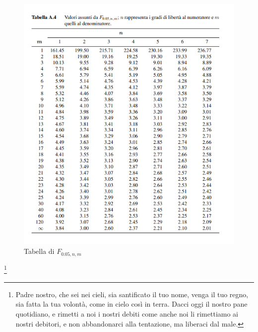 \documentclass[]{article}
\begin{document}
    \begin{figure}[H]
        \caption{Tabella di $F_{0.05, n, m}$}
        \begin{minipage}{0.59\textwidth}
            \includegraphics[width=\textwidth]{images/F_table.png}
        \end{minipage}
        \begin{minipage}{0.4\textwidth}
        \end{minipage}
    \end{figure}
    \footnote{Padre nostro, che sei nei cieli, sia santificato il tuo nome, venga il tuo regno, sia fatta la tua volontà, come in cielo così in terra. Dacci oggi il nostro pane quotidiano, e rimetti a noi i nostri debiti come anche noi li rimettiamo ai nostri debitori, e non abbandonarci alla tentazione, ma liberaci dal male.}
\end{document}
